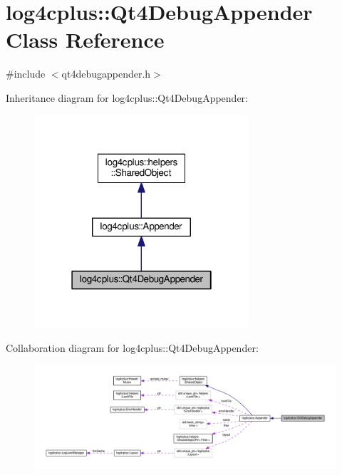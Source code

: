 \hypertarget{classlog4cplus_1_1Qt4DebugAppender}{\section{log4cplus\-:\-:Qt4\-Debug\-Appender Class Reference}
\label{classlog4cplus_1_1Qt4DebugAppender}
}


{\ttfamily \#include $<$qt4debugappender.\-h$>$}



Inheritance diagram for log4cplus\-:\-:Qt4\-Debug\-Appender\-:
\nopagebreak
\begin{figure}[H]
\begin{center}
\leavevmode
\includegraphics[width=226pt]{classlog4cplus_1_1Qt4DebugAppender__inherit__graph}
\end{center}
\end{figure}


Collaboration diagram for log4cplus\-:\-:Qt4\-Debug\-Appender\-:
\nopagebreak
\begin{figure}[H]
\begin{center}
\leavevmode
\includegraphics[width=350pt]{classlog4cplus_1_1Qt4DebugAppender__coll__graph}
\end{center}
\end{figure}
